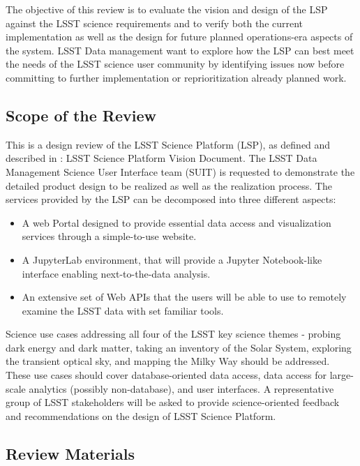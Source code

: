 \documentclass[DM,lsstdraft,STS,toc]{lsstdoc}
\begin{document}
The objective of this review is to evaluate the vision and design of the LSP against the LSST science requirements and to verify both the current implementation 
as well as the design for future planned operations-era aspects of the system.  LSST Data management want to explore how the LSP can best meet the needs of the LSST science user community by 
identifying issues now before committing to further implementation or reprioritization already planned work.


\subsection{Scope of the Review}
\label{sec:scope}
This is a design review of the LSST Science Platform (LSP), as defined and described in : LSST Science Platform Vision Document. 
The LSST Data Management Science User Interface team (SUIT) is requested to demonstrate the detailed product design to be realized as well as the realization process. 
The services provided by the LSP can be decomposed into  three different aspects:
\begin{itemize}
\item A web Portal designed to provide essential data access and visualization services through a simple-to-use website.
\item A JupyterLab environment, that will provide a Jupyter Notebook-like interface enabling next-to-the-data analysis.
\item An extensive set of Web APIs that the users will be able to use to remotely examine the LSST data with set familiar tools. 
\end{itemize}

Science use cases addressing all four of the LSST key science themes - probing dark energy and dark matter, 
taking an inventory of the Solar System, exploring the transient optical sky, and mapping the Milky Way should be addressed. 
These use cases should cover database-oriented data access, data access for large-scale analytics (possibly non-database), and user interfaces.
A representative group of LSST stakeholders will be asked to provide science-oriented feedback and recommendations on the design of LSST Science Platform. 

\subsection{Review Materials}
\label{sec:materials}
\end{document}
